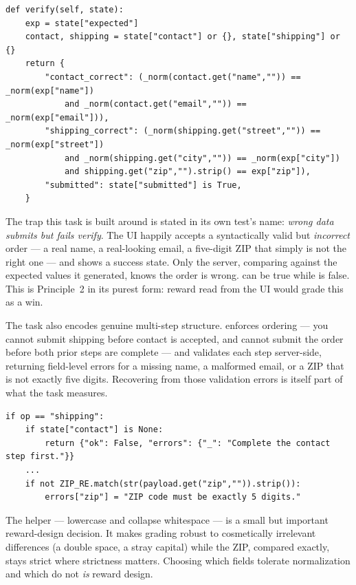 \documentclass[11pt,openany]{book}
\newcommand{\code}[1]{\textcolor{clayd}{\texttt{\detokenize{#1}}}}
\begin{document}
\begin{lstlisting}[style=py]
def verify(self, state):
    exp = state["expected"]
    contact, shipping = state["contact"] or {}, state["shipping"] or {}
    return {
        "contact_correct": (_norm(contact.get("name","")) == _norm(exp["name"])
            and _norm(contact.get("email","")) == _norm(exp["email"])),
        "shipping_correct": (_norm(shipping.get("street","")) == _norm(exp["street"])
            and _norm(shipping.get("city","")) == _norm(exp["city"])
            and shipping.get("zip","").strip() == exp["zip"]),
        "submitted": state["submitted"] is True,
    }
\end{lstlisting}

The trap this task is built around is stated in its own test's name:
\emph{wrong data submits but fails verify}. The UI happily accepts a
syntactically valid but \emph{incorrect} order — a real name, a real-looking
email, a five-digit ZIP that simply is not the right one — and shows a success
state. Only the server, comparing against the expected values it generated,
knows the order is wrong. \code{submitted} can be true while \code{success} is
false. This is Principle~2 in its purest form: reward read from the UI would
grade this as a win.

The task also encodes genuine multi-step structure. \code{handle_action}
enforces ordering — you cannot submit shipping before contact is accepted, and
cannot submit the order before both prior steps are complete — and validates each
step server-side, returning field-level errors for a missing name, a malformed
email, or a ZIP that is not exactly five digits. Recovering from those validation
errors is itself part of what the task measures.

\begin{lstlisting}[style=py]
if op == "shipping":
    if state["contact"] is None:
        return {"ok": False, "errors": {"_": "Complete the contact step first."}}
    ...
    if not ZIP_RE.match(str(payload.get("zip","")).strip()):
        errors["zip"] = "ZIP code must be exactly 5 digits."
\end{lstlisting}

The \code{_norm} helper — lowercase and collapse whitespace — is a small but
important reward-design decision. It makes grading robust to cosmetically
irrelevant differences (a double space, a stray capital) while the ZIP, compared
exactly, stays strict where strictness matters. Choosing which fields tolerate
normalization and which do not \emph{is} reward design.
\end{document}

